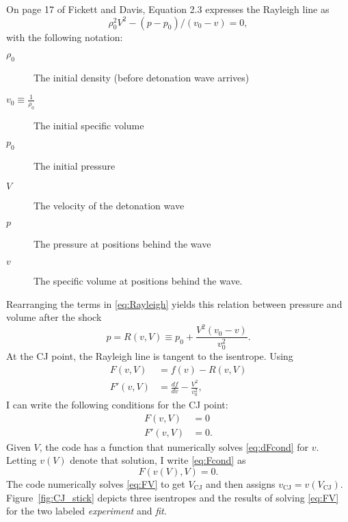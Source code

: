 \documentclass[11pt]{article}
\newcommand{\eos}{f}
\begin{document}
On page 17 of Fickett and Davis, Equation 2.3 expresses the Rayleigh
line as
\begin{equation}
  \label{eq:Rayleigh}
  \rho_0^2 V^2 - (p-p_0)/(v_0-v) = 0,
\end{equation}
with the following notation:
\begin{description}
\item[$\rho_0$] The initial density (before detonation wave arrives)
\item[$v_0\equiv\frac{1}{\rho_0}$] The initial specific volume
\item[$p_0$] The initial pressure
\item[$V$] The velocity of the detonation wave
\item[$p$] The pressure at positions behind the wave
\item[$v$] The specific volume at positions behind the wave.
\end{description}
Rearranging the terms in \eqref{eq:Rayleigh} yields this relation
between pressure and volume after the shock
\begin{equation*}
  p = R(v,V) \equiv p_0 + \frac{V^2(v_0-v)}{v_0^2}.
\end{equation*}
At the CJ point, the Rayleigh line is tangent to the isentrope.
Using
\begin{align*}
  F(v,V) &= \eos(v) - R(v,V) \\
  F'(v,V) &= \frac{d \eos}{d v} - \frac{V^2}{v_0^2},
\end{align*}
I can write the following conditions for the CJ point:
\begin{subequations}
  \begin{align}
    \label{eq:Fcond}
    F(v,V) &= 0 \\
    \label{eq:dFcond}
    F'(v,V) &= 0.
  \end{align}
\end{subequations}
Given $V$, the code has a function that numerically solves
\eqref{eq:dFcond} for $v$.  Letting $v(V)$ denote that solution, I
write \eqref{eq:Fcond} as
\begin{equation}
  \label{eq:FV}
  F(v(V),V) = 0.
\end{equation}
The code numerically solves \eqref{eq:FV} to get $V_{\text{CJ}}$ and
then assigns $v_{\text{CJ}} = v(V_{\text{CJ}})$.
Figure~\ref{fig:CJ_stick} depicts three isentropes and the results of
solving \eqref{eq:FV} for the two labeled \emph{experiment} and
\emph{fit}.
\end{document}
